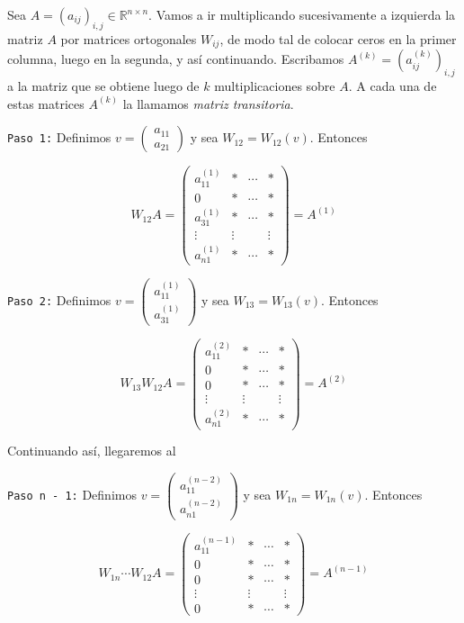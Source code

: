 Sea $A = (a_{ij})_{i, j} \in \mathbb{R}^{n \times n}$. Vamos a ir multiplicando sucesivamente a izquierda la matriz $A$ por matrices ortogonales $W_{ij}$, de modo tal de colocar ceros en la primer columna, luego en la segunda, y así continuando. Escribamos $A^{(k)} = (a^{(k)}_{ij})_{i, j}$ a la matriz que se obtiene luego de $k$ multiplicaciones sobre $A$. A cada una de estas matrices $A^{(k)}$ la llamamos \textit{matriz transitoria}.

\texttt{Paso 1:} Definimos $v = \begin{pmatrix}a_{11} \\ a_{21}\end{pmatrix}$ y sea $W_{12} = W_{12}(v)$. Entonces

\[W_{12}A = \begin{pmatrix}
a_{11}^{(1)} 	& * & \cdots & * \\
0				& * & \cdots & * \\
a_{31}^{(1)}		& * & \cdots & * \\
\vdots			& \vdots &  & \vdots \\
a_{n1}^{(1)}		& * & \cdots & *
\end{pmatrix} = A^{(1)}\]

\texttt{Paso 2:} Definimos $v = \begin{pmatrix}a_{11}^{(1)} \\ a_{31}^{(1)}\end{pmatrix}$ y sea $W_{13} = W_{13}(v)$. Entonces

\[W_{13}W_{12}A = \begin{pmatrix}
a_{11}^{(2)} 	& * & \cdots & * \\
0				& * & \cdots & * \\
0				& * & \cdots & * \\
\vdots			& \vdots &  & \vdots \\
a_{n1}^{(2)}		& * & \cdots & *
\end{pmatrix} = A^{(2)}\]

Continuando así, llegaremos al

\texttt{Paso n - 1:} Definimos $v = \begin{pmatrix}a_{11}^{(n - 2)} \\ a_{n1}^{(n - 2)}\end{pmatrix}$ y sea $W_{1n} = W_{1n}(v)$. Entonces

 \[W_{1n} \cdots W_{12}A = \begin{pmatrix}
a_{11}^{(n - 1)} 	& * & \cdots & * \\
0				& * & \cdots & * \\
0				& * & \cdots & * \\
\vdots			& \vdots &  & \vdots \\
0				& * & \cdots & *
\end{pmatrix} = A^{(n - 1)}\]

